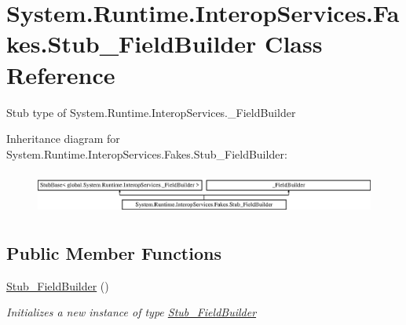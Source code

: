 \hypertarget{class_system_1_1_runtime_1_1_interop_services_1_1_fakes_1_1_stub___field_builder}{\section{System.\-Runtime.\-Interop\-Services.\-Fakes.\-Stub\-\_\-\-Field\-Builder Class Reference}
\label{class_system_1_1_runtime_1_1_interop_services_1_1_fakes_1_1_stub___field_builder}
}


Stub type of System.\-Runtime.\-Interop\-Services.\-\_\-\-Field\-Builder 


Inheritance diagram for System.\-Runtime.\-Interop\-Services.\-Fakes.\-Stub\-\_\-\-Field\-Builder\-:\begin{figure}[H]
\begin{center}
\leavevmode
\includegraphics[height=1.417722cm]{class_system_1_1_runtime_1_1_interop_services_1_1_fakes_1_1_stub___field_builder}
\end{center}
\end{figure}
\subsection*{Public Member Functions}
\begin{DoxyCompactItemize}
\item 
\hyperlink{class_system_1_1_runtime_1_1_interop_services_1_1_fakes_1_1_stub___field_builder_afa30e63960df108e04c023c81ee5cf10}{Stub\-\_\-\-Field\-Builder} ()
\begin{DoxyCompactList}\small\item\em Initializes a new instance of type \hyperlink{class_system_1_1_runtime_1_1_interop_services_1_1_fakes_1_1_stub___field_builder}{Stub\-\_\-\-Field\-Builder}\end{DoxyCompactList}\end{DoxyCompactItemize}
